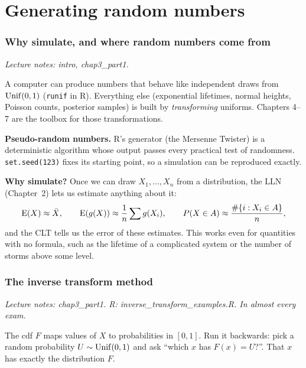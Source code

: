 \part{Generating random numbers}

\section{Why simulate, and where random numbers come from}
\textit{Lecture notes: intro, chap3\_part1.}

\begin{idea}
A computer can produce numbers that behave like independent draws from $\mathrm{Unif}(0,1)$ (\texttt{runif} in R). Everything else (exponential lifetimes, normal heights, Poisson counts, posterior samples) is built by \emph{transforming} uniforms. Chapters 4--7 are the toolbox for those transformations.
\end{idea}

\textbf{Pseudo-random numbers.} R's generator (the Mersenne Twister) is a deterministic algorithm whose output passes every practical test of randomness. \texttt{set.seed(123)} fixes its starting point, so a simulation can be reproduced exactly.

\textbf{Why simulate?} Once we can draw $X_1,\dots,X_n$ from a distribution, the LLN (Chapter~2) lets us estimate anything about it:
\[
\mathrm{E}(X) \approx \bar X,\qquad \mathrm{E}(g(X)) \approx \frac1n\sum g(X_i),\qquad P(X\in A) \approx \frac{\#\{i : X_i\in A\}}{n},
\]
and the CLT tells us the error of these estimates. This works even for quantities with no formula, such as the lifetime of a complicated system or the number of storms above some level.

\section{The inverse transform method}
\textit{Lecture notes: chap3\_part1. R: inverse\_transform\_examples.R. In almost every exam.}

\begin{idea}
The cdf $F$ maps values of $X$ to probabilities in $[0,1]$. Run it backwards: pick a random probability $U\sim\mathrm{Unif}(0,1)$ and ask ``which $x$ has $F(x) = U$?''. That $x$ has exactly the distribution $F$.
\end{idea}


